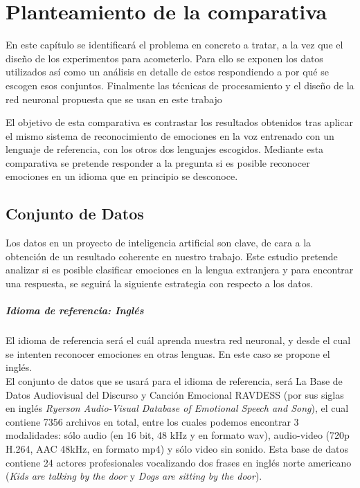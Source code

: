 \documentclass[11pt,a4paper,spanish]{book}
\begin{document}
	\chapter{Planteamiento de la comparativa}
	
	En este capítulo se identificará el problema en concreto a tratar, a la vez que el diseño de los experimentos para acometerlo. Para ello se exponen los datos utilizados así como un análisis en detalle de estos respondiendo a por qué se escogen esos conjuntos. Finalmente las técnicas de procesamiento y el diseño de la red neuronal propuesta que se usan en este trabajo
	
	El objetivo de esta comparativa es contrastar los resultados obtenidos tras aplicar el mismo sistema de reconocimiento de emociones en la voz entrenado con un lenguaje de referencia, con los otros dos lenguajes escogidos. Mediante esta comparativa se pretende responder a la pregunta si es posible reconocer emociones en un idioma que en principio se desconoce.
	
	\section{Conjunto de Datos}
	\label{lb_c4_datos}
	Los datos en un proyecto de inteligencia artificial son clave, de cara a la obtención de un resultado coherente en nuestro trabajo. Este estudio pretende analizar si es posible clasificar emociones en la lengua extranjera y para encontrar una respuesta, se seguirá la siguiente estrategia con respecto a los datos.
	
	\paragraph{Idioma de referencia: Inglés} El idioma de referencia será el cuál aprenda nuestra red neuronal, y desde el cual se intenten reconocer emociones en otras lenguas. En este caso se propone el inglés.\\
	
	El conjunto de datos que se usará para el idioma de referencia, será La Base de Datos Audiovisual del Discurso y Canción Emocional RAVDESS (por sus siglas en inglés \emph{Ryerson Audio-Visual Database of Emotional Speech and Song}), el cual contiene 7356 archivos en total, entre los cuales podemos encontrar 3 modalidades: sólo audio (en 16 bit, 48 kHz y en formato wav), audio-video (720p H.264, AAC 48kHz, en formato mp4) y sólo video sin sonido. Esta base de datos contiene 24 actores profesionales vocalizando dos frases en inglés norte americano (\emph{Kids are talking by the door} y \emph{Dogs are sitting by the door}).
	
\end{document}
